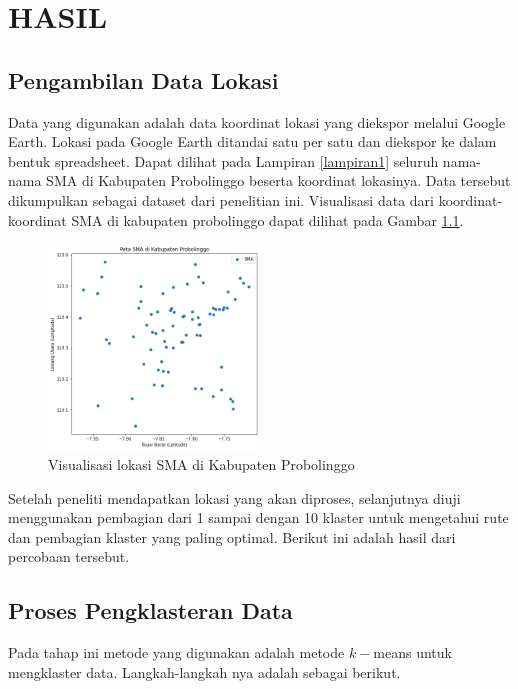 \chapter{HASIL}

\section{Pengambilan Data Lokasi}

Data yang digunakan adalah data koordinat lokasi yang diekspor melalui Google Earth. Lokasi pada Google Earth ditandai satu per satu dan diekspor ke dalam bentuk spreadsheet. Dapat dilihat pada Lampiran \ref{lampiran1} seluruh nama-nama SMA di Kabupaten Probolinggo beserta koordinat lokasinya. Data tersebut dikumpulkan sebagai dataset dari penelitian ini. Visualisasi data dari koordinat-koordinat SMA di kabupaten probolinggo dapat dilihat pada Gambar \ref{fig:petasma}.

\begin{figure}[H]
  \centering
  \includegraphics[width=0.5\textwidth]{Gambar/peta sma.png}
  \caption{Visualisasi lokasi SMA di Kabupaten Probolinggo}
  \label{fig:petasma}
\end{figure}

Setelah peneliti mendapatkan lokasi yang akan diproses, selanjutnya diuji menggunakan pembagian dari 1 sampai dengan 10 klaster untuk mengetahui rute dan pembagian klaster yang paling optimal. Berikut ini adalah hasil dari percobaan tersebut.

\section{Proses Pengklasteran Data}

Pada tahap ini metode yang digunakan adalah metode $k-$means untuk mengklaster data. Langkah-langkah nya adalah sebagai berikut.

